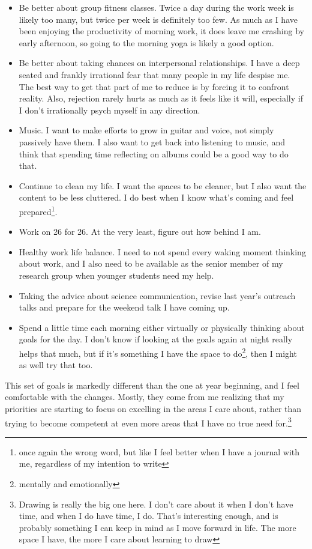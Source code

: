 \documentclass[12pt]{article}[titlepage]
\renewcommand{\,}{\textsuperscript{,}}
\begin{document}
\begin{itemize}
\item Be better about group fitness classes. Twice a day during the work week is likely too many, but twice per week is definitely too few. As much as I have been enjoying the productivity of morning work, it does leave me crashing by early afternoon, so going to the morning yoga is likely a good option.  
\item Be better about taking chances on interpersonal relationships. I have a deep seated and frankly irrational fear that many people in my life despise me. The best way to get that part of me to reduce is by forcing it to confront reality. Also, rejection rarely hurts as much as it feels like it will, especially if I don't irrationally psych myself in any direction.  
\item Music. I want to make efforts to grow in guitar and voice, not simply passively have them. I also want to get back into listening to music, and think that spending time reflecting on albums could be a good way to do that.  
\item Continue to clean my life. I want the spaces to be cleaner, but I also want the content to be less cluttered. I do best when I know what's coming and feel prepared\footnote{once again the wrong word, but like I feel better when I have a journal with me, regardless of my intention to write}.  
\item Work on 26 for 26. At the very least, figure out how behind I am.  
\item Healthy work life balance. I need to not spend every waking moment thinking about work, and I also need to be available as the senior member of my research group when younger students need my help.  
\item Taking the advice about science communication, revise last year's outreach talks and prepare for the weekend talk I have coming up.  
\item Spend a little time each morning either virtually or physically thinking about goals for the day. I don't know if looking at the goals again at night really helps that much, but if it's something I have the space to do\footnote{mentally and emotionally}, then I might as well try that too.  
\end{itemize}

This set of goals is markedly different than the one at year beginning, and I feel comfortable with the changes.  
Mostly, they come from me realizing that my priorities are starting to focus on excelling in the areas I care about, rather than trying to become competent at even more areas that I have no true need for.\footnote{Drawing is really the big one here. I don't care about it when I don't have time, and when I do have time, I do. That's interesting enough, and is probably something I can keep in mind as I move forward in life. The more space I have, the more I care about learning to draw}
\end{document}
